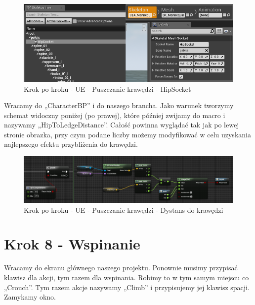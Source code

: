 \documentclass[openright]{xmgr}
\begin{document}
\begin{figure}[!htb]
    \begin{center}
    \includegraphics[scale=0.5]{Screeny/UeKrokPoKroku/HipSocket}
    \end{center}
    \caption{Krok po kroku - UE - Puszczanie krawędzi - HipSocket}
\end{figure}

Wracamy do „CharacterBP” i do naszego brancha. Jako warunek tworzymy schemat widoczny poniżej (po prawej), które później zwijamy do macro i nazywamy „HipToLedgeDistance”. Całość powinna wyglądać tak jak po lewej stronie obrazka, przy czym podane liczby możemy modyfikować w celu uzyskania najlepszego efektu przybliżenia do krawędzi.

\begin{figure}[!htb]
    \begin{center}
    \includegraphics[scale=0.5]{Screeny/UeKrokPoKroku/HipToLedgeDistanceMacro}
    \end{center}
    \caption{Krok po kroku - UE - Puszczanie krawędzi - Dystans do krawędzi}
\end{figure}

\newpage
\section{Krok 8 - Wspinanie}

Wracamy do ekranu głównego naszego projektu. Ponownie musimy przypisać klawisz dla akcji, tym razem dla wspinania. Robimy to w tym samym miejscu co „Crouch”. Tym razem akcje nazywamy „Climb” i przypisujemy jej klawisz spacji. Zamykamy okno.
\end{document}
